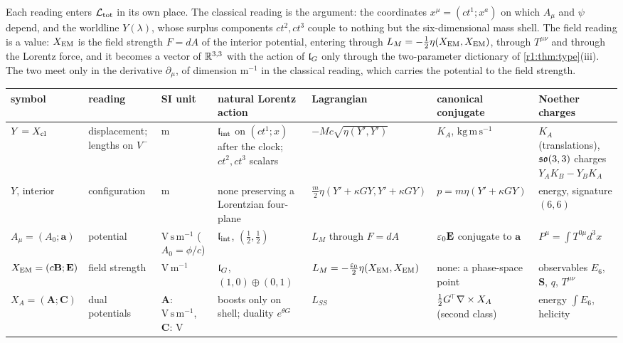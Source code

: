 Each reading enters $\mathcal L_{\rm tot}$ in its own place. The classical reading is the argument: the coordinates $x^\mu=(ct^1;x^a)$ on which
$A_\mu$ and $\psi$ depend, and the worldline $Y(\lambda)$, whose surplus components $ct^2,ct^3$ couple to nothing but the six-dimensional
mass shell. The field reading is a value: $X_{\rm EM}$ is the field strength $F=dA$ of the interior potential, entering through
$L_M=-\tfrac12\eta(X_{\rm EM},X_{\rm EM})$, through $T^{\mu\nu}$ and through the Lorentz force, and it becomes a vector of $\mathbb{R}^{3,3}$ with
the action of $\mathfrak l_G$ only through the two-parameter dictionary of \cref{r1:thm:type}(iii). The two meet only in the derivative
$\partial_\mu$, of dimension $\mathrm m^{-1}$ in the classical reading, which carries the potential to the field strength.

\begin{table}[t]
\centering
\footnotesize
\setlength{\tabcolsep}{3pt}
\renewcommand{\arraystretch}{1.15}
\begin{tabular}{@{}>{\raggedright\arraybackslash}p{1.45cm}>{\raggedright\arraybackslash}p{1.95cm}>{\raggedright\arraybackslash}p{1.25cm}%
>{\raggedright\arraybackslash}p{2.2cm}>{\raggedright\arraybackslash}p{2.9cm}>{\raggedright\arraybackslash}p{2.35cm}>{\raggedright\arraybackslash}p{2.4cm}@{}}
\toprule
symbol & reading & SI unit & natural Lorentz action & Lagrangian & canonical conjugate & Noether charges\\
\midrule
$Y=X_{\rm cl}$ & displacement; lengths on $V^-$ & m & $\mathfrak l_{\rm int}$ on $(ct^1;x)$ after the clock; $ct^2,ct^3$ scalars & $-Mc\sqrt{\eta(Y',Y')}$ &
$K_A$, $\mathrm{kg\,m\,s^{-1}}$ & $K_A$ (translations), $\mathfrak{so}(3,3)$ charges $Y_AK_B-Y_BK_A$\\
$Y$, interior & configuration & m & none preserving a Lorentzian four-plane & $\tfrac m2\eta(Y'+\kappa GY,Y'+\kappa GY)$ & $p=m\eta(Y'+\kappa GY)$ & energy, signature $(6,6)$\\
$A_\mu=(A_0;\mathbf a)$ & potential & $\mathrm{V\,s\,m^{-1}}$ ($A_0=\phi/c$) & $\mathfrak l_{\rm int}$, $(\tfrac12,\tfrac12)$ & $L_M$ through $F=dA$ & $\varepsilon_0\mathbf E$ conjugate to $\mathbf a$ & $P^\mu=\int T^{0\mu}d^3x$\\
$X_{\rm EM}=(c\mathbf B;\mathbf E)$ & field strength & $\mathrm{V\,m^{-1}}$ & $\mathfrak l_G$, $(1,0)\oplus(0,1)$ & $L_M=-\tfrac{\varepsilon_0}2\eta(X_{\rm EM},X_{\rm EM})$ &
none: a phase-space point & observables $E_6$, $\mathbf S$, $q$, $T^{\mu\nu}$\\
$X_A=(\mathbf A;\mathbf C)$ & dual potentials & $\mathbf A$: $\mathrm{V\,s\,m^{-1}}$, $\mathbf C$: V & boosts only on shell; duality $e^{\theta G}$ & $L_{SS}$ & $\tfrac12G^{\!\top}\nabla\times X_A$ (second class) & energy $\int E_6$, helicity\\

\end{tabular}
\end{table}
